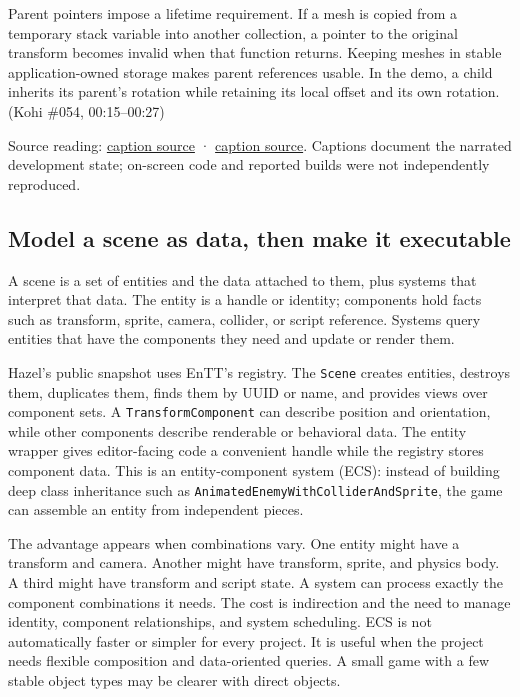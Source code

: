 Parent pointers impose a lifetime requirement. If a mesh is copied from a temporary stack variable into another collection, a pointer to the original transform becomes invalid when that function returns. Keeping meshes in stable application-owned storage makes parent references usable. In the demo, a child inherits its parent's rotation while retaining its local offset and its own rotation. (Kohi \#054, 00:15--00:27)

Source reading: \href{https://www.youtube.com/watch?v=73KBx90cD0M}{caption source} · \href{https://www.youtube.com/watch?v=r2535XLneiI}{caption source}. Captions document the narrated development state; on-screen code and reported builds were not independently reproduced.

\subsection{Model a scene as data, then make it executable}\label{06-engine-ii-ch031-model-a-scene-as-data-then-make-it-executable}

A scene is a set of entities and the data attached to them, plus systems that interpret that data. The entity is a handle or identity; components hold facts such as transform, sprite, camera, collider, or script reference. Systems query entities that have the components they need and update or render them.

Hazel's public snapshot uses EnTT's registry. The \texttt{Scene} creates entities, destroys them, duplicates them, finds them by UUID or name, and provides views over component sets. A \texttt{TransformComponent} can describe position and orientation, while other components describe renderable or behavioral data. The entity wrapper gives editor-facing code a convenient handle while the registry stores component data. This is an entity-component system (ECS): instead of building deep class inheritance such as \texttt{AnimatedEnemyWithColliderAndSprite}, the game can assemble an entity from independent pieces.

The advantage appears when combinations vary. One entity might have a transform and camera. Another might have transform, sprite, and physics body. A third might have transform and script state. A system can process exactly the component combinations it needs. The cost is indirection and the need to manage identity, component relationships, and system scheduling. ECS is not automatically faster or simpler for every project. It is useful when the project needs flexible composition and data-oriented queries. A small game with a few stable object types may be clearer with direct objects.

